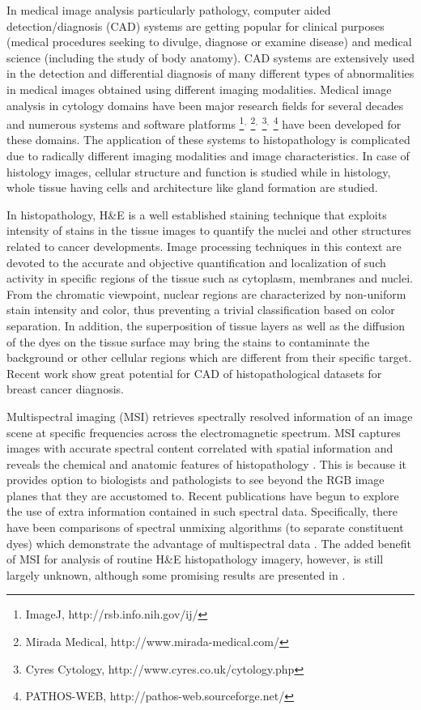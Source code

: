 \documentclass[10pt,twocolumn,letterpaper]{article}
\begin{document}
In medical image analysis particularly pathology, computer aided detection/diagnosis (CAD) systems are getting popular for clinical purposes (medical procedures seeking to divulge, diagnose or examine disease) and medical science (including the study of body anatomy). CAD systems are extensively used in the detection and differential diagnosis of many different types of abnormalities in medical images obtained using different imaging modalities. Medical image analysis in cytology domains have been major research fields for several decades and numerous systems \cite{ wolberg1993, stewart1998, cibas2009, plissiti2013, gong2013} and software platforms
\footnote{ImageJ, http://rsb.info.nih.gov/ij/}$^,$
\footnote{Mirada Medical, http://www.mirada-medical.com/}$^,$
\footnote{Cyres Cytology, http://www.cyres.co.uk/cytology.php}$^,$
\footnote{PATHOS-WEB, http://pathos-web.sourceforge.net/}
 have been developed for these domains. The application of these systems to histopathology is complicated due to radically different imaging modalities and image characteristics. In case of histology images, cellular structure and function is studied while in histology, whole tissue having cells and architecture like gland formation are studied.
 
In histopathology, H\&E is a well established staining technique that exploits intensity of stains in the tissue images to quantify the nuclei and other structures related to cancer developments. Image processing techniques in this context are devoted to the accurate and objective quantification and localization of such activity in specific regions of the tissue such as cytoplasm, membranes and nuclei. From the chromatic viewpoint, nuclear regions are characterized by non-uniform stain intensity and color, thus preventing a trivial classification based on color separation. In addition, the superposition of tissue layers as well as the diffusion of the dyes on the tissue surface may bring the stains to contaminate the background or other cellular regions which are different from their specific target. Recent work \cite{khan2012b, irshad2013a, irshad2013b} show great potential for CAD of histopathological datasets for breast cancer diagnosis.

Multispectral imaging (MSI) retrieves spectrally resolved information of an image scene at specific frequencies across the electromagnetic spectrum. MSI captures images with accurate spectral content correlated with spatial information and reveals the chemical and anatomic features of histopathology \cite{levenson2006b, levenson2008}. This is because it provides option to biologists and pathologists to see beyond the RGB image planes that they are accustomed to. Recent publications \cite{fernandez2005, levenson2006, wu2012, khelifi2012} have begun to explore the use of extra information contained in such spectral data. Specifically, there have been comparisons of spectral unmixing algorithms (to separate constituent dyes) which demonstrate the advantage of multispectral data \cite{levenson2003, gentry1999}. The added benefit of MSI for analysis of routine H\&E histopathology imagery, however, is still largely unknown, although some promising results are presented in \cite{roula2003, fernandez2005, khelifi2012, wu2012}.
\end{document}
